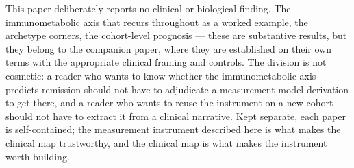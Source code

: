 This paper deliberately reports no clinical or biological finding. The immunometabolic
axis that recurs throughout as a worked example, the archetype corners, the
cohort-level prognosis --- these are substantive results, but they belong to the
companion paper, where they are established on their own terms with the appropriate
clinical framing and controls. The division is not cosmetic: a reader who wants to
know whether the immunometabolic axis predicts remission should not have to
adjudicate a measurement-model derivation to get there, and a reader who wants to
reuse the instrument on a new cohort should not have to extract it from a clinical
narrative. Kept separate, each paper is self-contained; the measurement instrument
described here is what makes the clinical map trustworthy, and the clinical map is
what makes the instrument worth building.
